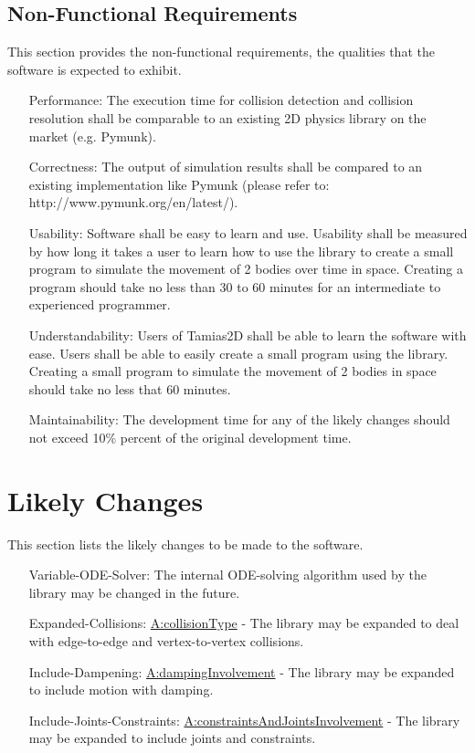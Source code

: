 \documentclass[12pt]{article}
\begin{document}
\subsection{Non-Functional Requirements}
\label{Sec:NFRs}
This section provides the non-functional requirements, the qualities that the software is expected to exhibit.

\begin{itemize}
\item[Performance:\phantomsection\label{performance}]{The execution time for collision detection and collision resolution shall be comparable to an existing 2D physics library on the market (e.g. Pymunk).}
\item[Correctness:\phantomsection\label{correctness}]{The output of simulation results shall be compared to an existing implementation like Pymunk (please refer to: http://www.pymunk.org/en/latest/).}
\item[Usability:\phantomsection\label{usability}]{Software shall be easy to learn and use. Usability shall be measured by how long it takes a user to learn how to use the library to create a small program to simulate the movement of 2 bodies over time in space. Creating a program should take no less than 30 to 60 minutes for an intermediate to experienced programmer.}
\item[Understandability:\phantomsection\label{understandability}]{Users of Tamias2D shall be able to learn the software with ease. Users shall be able to easily create a small program using the library. Creating a small program to simulate the movement of 2 bodies in space should take no less that 60 minutes.}
\item[Maintainability:\phantomsection\label{maintainability}]{The development time for any of the likely changes should not exceed 10$\%$ percent of the original development time.}
\end{itemize}
\section{Likely Changes}
\label{Sec:LCs}
This section lists the likely changes to be made to the software.

\begin{itemize}
\item[Variable-ODE-Solver:\phantomsection\label{lcVODES}]{The internal ODE-solving algorithm used by the library may be changed in the future.}
\item[Expanded-Collisions:\phantomsection\label{lcEC}]{\hyperref[assumpCT]{A:collisionType} - The library may be expanded to deal with edge-to-edge and vertex-to-vertex collisions.}
\item[Include-Dampening:\phantomsection\label{lcID}]{\hyperref[assumpDI]{A:dampingInvolvement} - The library may be expanded to include motion with damping.}
\item[Include-Joints-Constraints:\phantomsection\label{lcIJC}]{\hyperref[assumpCAJI]{A:constraintsAndJointsInvolvement} - The library may be expanded to include joints and constraints.}
\end{itemize}
\end{document}
